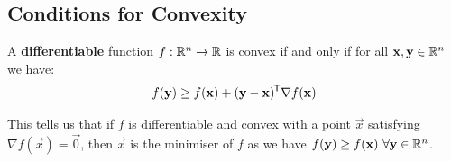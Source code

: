 \documentclass[../main.tex]{subfiles}
\begin{document}
\subsection{Conditions for Convexity}
\begin{theorem}
  A \textbf{differentiable} function $f: \mathbb{R}^{n} \to \mathbb{R}$ is convex if and only if for all $\mathbf{\bm{x}}, \mathbf{\bm{y}} \in \mathbb{R}^{n}$ we have: \label{firstOrderCond}
  \[
    f(\mathbf{\bm{y}}) \geq f(\mathbf{\bm{x}}) + (\mathbf{\bm{y}} - \mathbf{\bm{x}})^{{\mkern-1.5mu\mathsf{T}}} \nabla f(\mathbf{\bm{x}})
  \]
\end{theorem}
\begin{remark}
  This tells us that if $f$ is differentiable and convex with a point $\vec{x}$ satisfying $\nabla f(\vec{x}) = \vec{0}$, then $\vec{x}$ is the minimiser of $f$ as we have $f(\vec{y}) \geq f(\vec{x})\ \forall \vec{y} \in \R^{n}$.
\end{remark}
\end{document}
